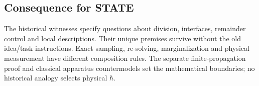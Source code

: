 \documentclass[11pt,a4paper]{article}
\begin{document}
\hypertarget{consequence-for-state}{%
\subsection{Consequence for STATE}\label{consequence-for-state}}

The historical witnesses specify questions about division, interfaces,
remainder control and local descriptions. Their unique premises survive
without the old idea/task instructions. Exact sampling, re-solving,
marginalization and physical measurement have different composition
rules. The separate finite-propagation proof and classical apparatus
countermodels set the mathematical boundaries; no historical analogy
selects physical \(\hbar\).
\end{document}
